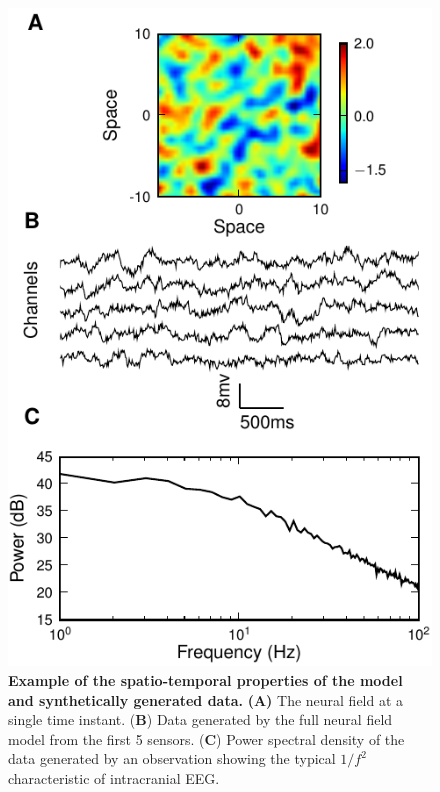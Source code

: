 \documentclass[10pt]{article}
\begin{document}
\begin{figure}[!ht]
\begin{center}
\includegraphics{./Graph/pdf/Figure3.pdf}
\end{center}
\caption{{\bf Example of the spatio-temporal properties of the model and synthetically generated data.} \textbf{(A)} The neural field at a single time instant. (\textbf{B}) Data generated by the full neural field model from the first 5 sensors. (\textbf{C}) Power spectral density of the data generated by an observation showing the typical $1/f^2$ characteristic of intracranial EEG.} 
\label{fig:experimental design}
\end{figure}
\end{document}
